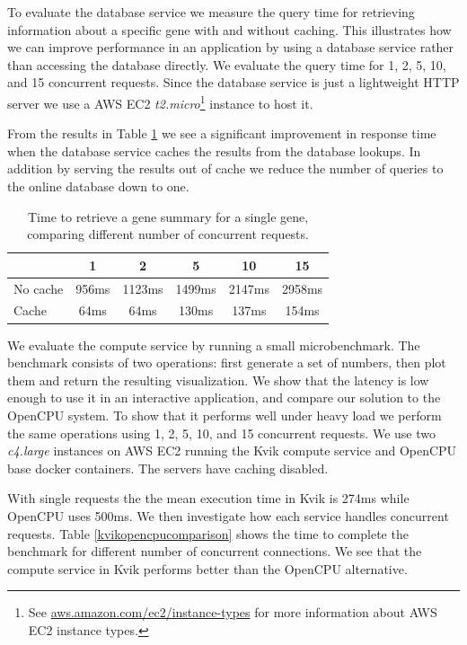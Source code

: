 To evaluate the database service we measure the query time for retrieving
information about a specific gene with and without caching. This illustrates how
we can improve performance in an application by using a database service rather
than accessing the database directly.  We evaluate the query time for 1, 2, 5,
10, and 15 concurrent requests. Since the database service is just a lightweight
HTTP server we use a AWS EC2 \emph{t2.micro}\footnote{See
\url{aws.amazon.com/ec2/instance-types} for more information about AWS EC2
instance types.} instance to host it.

From the results in Table \ref{db} we see a significant improvement in response
time when the database service caches the results from the database lookups. In
addition by serving the results out of cache we reduce the number of queries to
the online database down to one. 


\begin{table}[h]
    \begin{tabular}{| l | c | c | c | c | c | }
        \hline 
        & 1 & 2 & 5 & 10 & 15 \\ 
      \hline			
      No cache & 956ms & 1123ms & 1499ms & 2147ms & 2958ms\\
      \hline
      Cache & 64ms & 64ms & 130ms & 137ms & 154ms\\
      \hline  
    \end{tabular}
    \caption[]{Time to retrieve a gene summary for a single gene, comparing
    different number of concurrent requests.}
\label{db}
\end{table} 


We evaluate the compute service by running a small microbenchmark. The benchmark
consists of two operations: first generate a set of numbers, then plot them and
return the resulting visualization. We show that the latency is low enough to
use it in an interactive application, and compare our solution to the OpenCPU
system. To show that it performs well under heavy load
we perform the same operations using 1, 2, 5, 10, and 15 concurrent requests.
We use two \emph{c4.large} instances on AWS EC2 running the Kvik
compute service and OpenCPU base docker containers. The servers have caching
disabled. 

With single requests the the mean execution time in Kvik is 274ms while OpenCPU
uses 500ms. We then investigate how each service handles concurrent requests.
Table \ref{kvikopencpucomparison} shows the time to complete the benchmark for
different number of concurrent connections. We see that the compute service in
Kvik performs better than the OpenCPU alternative. 

